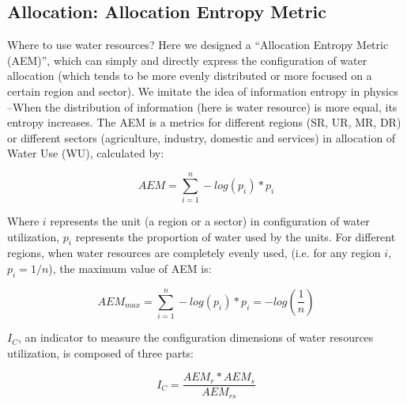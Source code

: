 \documentclass[9pt,twoside,lineno]{pnas-new}
\begin{document}
\subsection*{Allocation: Allocation Entropy Metric}
    Where to use water resources?
    Here we designed a ``Allocation Entropy Metric (AEM)'', which can simply and directly express the configuration of water allocation (which tends to be more evenly distributed or more focused on a certain region and sector).
    We imitate the idea of information entropy in physics --When the distribution of information (here is water resource) is more equal, its entropy increases.
    The AEM is a metrics for different regions (SR, UR, MR, DR) or different sectors (agriculture, industry, domestic and services) in allocation of Water Use (WU), calculated by:

    $$ AEM = \sum_{i=1}^n -log(p_{i}) * p_{i} $$

    Where $i$ represents the unit (a region or a sector) in configuration of water utilization, $p_i$ represents the proportion of water used by the units.
    For different regions, when water resources are completely evenly used, (i.e. for any region $i$, $p_i = 1/n $), the maximum value of AEM is:

    $$ AEM_{max} = \sum_{i=1}^n -log(p_{i}) * p_{i} = - log(\frac{1}{n}) $$

    $I_C$, an indicator to measure the configuration dimensions of water resources utilization, is composed of three parts:

    $$ I_C = \frac{AEM_{r}*AEM_{s}}{AEM_{rs}}$$
\end{document}
